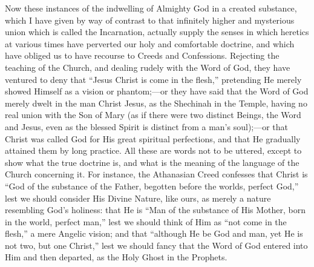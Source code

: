 Now these instances of the indwelling of Almighty God in a created
substance, which I have given by way of contrast to that infinitely
higher and mysterious union which is called the Incarnation, actually
supply the senses in which heretics at various times have perverted
our holy and comfortable doctrine, and which have obliged us to have
recourse to Creeds and Confessions. Rejecting the teaching of the
Church, and dealing rudely with the Word of God, they have ventured to
deny that ``Jesus Christ is come in the flesh,'' pretending He
merely showed Himself as a vision or phantom;—or they have said that
the Word of God merely dwelt in the man Christ Jesus, as the Shechinah
in the Temple, having no real union with the Son of Mary (as if there
were two distinct Beings, the Word and Jesus, even as the blessed
Spirit is distinct from a man's soul);—or that Christ was called God
for His great spiritual perfections, and that He gradually attained
them by long practice. All these are words not to be uttered, except
to show what the true doctrine is, and what is the meaning of the
language of the Church concerning it. For instance, the Athanasian
Creed confesses that Christ is ``God of the substance of the
Father, begotten before the worlds, perfect God,'' lest we should
consider His Divine Nature, like ours, as merely a nature resembling
God's holiness: that He is ``Man of the substance of His Mother,
born in the world, perfect man,'' lest we should think of Him as
``not come in the flesh,'' a mere Angelic vision; and that
``although He be God and man, yet He is not two, but one
Christ,'' lest we should fancy that the Word of God entered into
Him and then departed, as the Holy Ghost in the Prophets.

